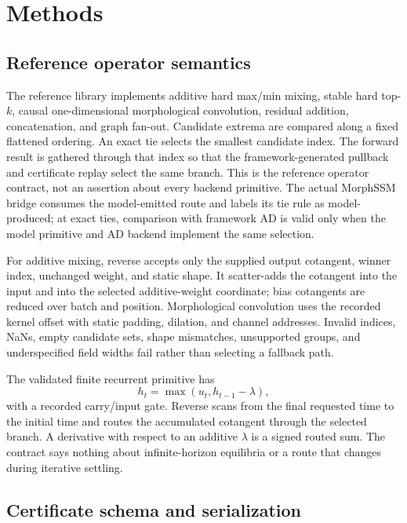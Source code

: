 \section{Methods}
\label{sec:methods}

\subsection{Reference operator semantics}

The reference library implements additive hard max/min mixing, stable hard
top-$k$, causal one-dimensional morphological convolution, residual addition,
concatenation, and graph fan-out.  Candidate extrema are compared along a fixed
flattened ordering.  An exact tie selects the smallest candidate index.  The
forward result is gathered through that index so that the framework-generated
pullback and certificate replay select the same branch.  This is the reference
operator contract, not an assertion about every backend primitive.  The actual
MorphSSM bridge consumes the model-emitted route and labels its tie rule as
model-produced; at exact ties, comparison with framework AD is valid only when
the model primitive and AD backend implement the same selection.

For additive mixing, reverse accepts only the supplied output cotangent, winner
index, unchanged weight, and static shape.  It scatter-adds the cotangent into
the input and into the selected additive-weight coordinate; bias cotangents are
reduced over batch and position.  Morphological convolution uses the recorded
kernel offset with static padding, dilation, and channel addresses.  Invalid
indices, NaNs, empty candidate sets, shape mismatches, unsupported groups, and
underspecified field widths fail rather than selecting a fallback path.

The validated finite recurrent primitive has
\begin{equation}
 h_t=\max(u_t,h_{t-1}-\lambda),
\end{equation}
with a recorded carry/input gate.  Reverse scans from the final requested time
to the initial time and routes the accumulated cotangent through the selected
branch.  A derivative with respect to an additive $\lambda$ is a signed routed
sum.  The contract says nothing about infinite-horizon equilibria or a route
that changes during iterative settling.

\subsection{Certificate schema and serialization}

